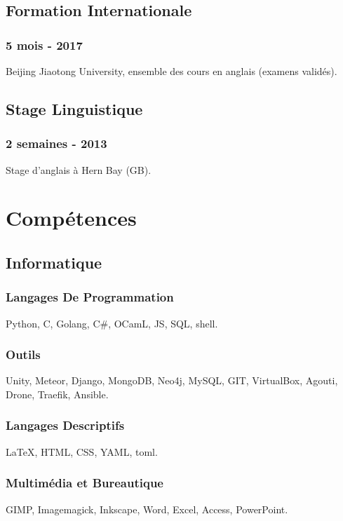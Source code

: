 \documentclass{article}
\begin{document}
\begin{multicols}{2}
            \subsection{Formation Internationale}
                \subsubsection{5 mois - 2017}
                    Beijing Jiaotong University, ensemble des cours en anglais (examens valid\'es).
            \subsection{Stage Linguistique}
                \subsubsection{2 semaines - 2013}
                    Stage d'anglais \`a Hern Bay (GB).

        \columnbreak

        \section{Comp\'etences}
            \subsection{Informatique}
                \subsubsection{Langages De Programmation}
                    Python, C, Golang, C\#, OCamL, JS, SQL, shell.
                \subsubsection{Outils}
                    Unity, Meteor, Django,  MongoDB, Neo4j, MySQL, GIT, VirtualBox, Agouti, Drone, Traefik, Ansible.
                \subsubsection{Langages Descriptifs}
                    {\LaTeX}, HTML, CSS, YAML, toml.
                \subsubsection{Multim\'edia et Bureautique}
                    GIMP, Imagemagick, Inkscape, Word, Excel, Access, PowerPoint.

\end{multicols}
\end{document}
